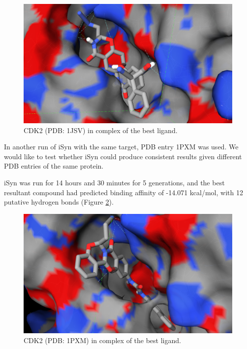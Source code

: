 \begin{figure}
\begin{center}
\includegraphics[width=\linewidth]{../isyn/1JSV.png}
\end{center}
\caption{CDK2 (PDB: 1JSV) in complex of the best ligand.}
\label{isyn:1JSV}
\end{figure}

In another run of iSyn with the same target, PDB entry 1PXM was used. We would like to test whether iSyn could produce consistent results given different PDB entries of the same protein.

iSyn was run for 14 hours and 30 minutes for 5 generations, and the best resultant compound had predicted binding affinity of -14.071 kcal/mol, with 12 putative hydrogen bonds (Figure \ref{isyn:1PXM}).
 
\begin{figure}
\begin{center}
\includegraphics[width=\linewidth]{../isyn/1PXM.png}
\end{center}
\caption{CDK2 (PDB: 1PXM) in complex of the best ligand.}
\label{isyn:1PXM}
\end{figure}

